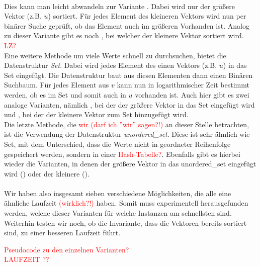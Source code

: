 \\
Dies kann man leicht abwandeln zur Variante \SorSea. Dabei wird nur der größere Vektor (z.B. $u$)
sortiert.
Für jedes Element des kleineren Vektors wird nun per binärer Suche geprüft, ob das Element auch im 
größeren Vorhanden ist. Analog zu dieser Variante gibt es noch \SeaSor, bei welcher 
der kleinere Vektor sortiert wird. \textcolor{red}{LZ?}
\\
Eine weitere Methode um  viele Werte schnell zu durchsuchen, bietet die Datenstruktur \textit{Set}.
Dabei wird jedes Element des einen Vektors (z.B. $u$) in das Set eingefügt. Die Datenstruktur
baut aus diesen Elementen dann einen Binären Suchbaum. Für jedes Element aus $v$ kann nun in logarithmischer
Zeit bestimmt werden, ob es im Set und somit auch in $u$ vorhanden ist. Auch hier gibt es zwei
analoge Varianten, nämlich \SetSea, bei der der größere Vektor in das Set eingefügt wird
und \SeaSet, bei der der kleinere Vektor zum Set hinzugefügt wird.
\\
Die letzte Methode, die \textcolor{red}{wir (darf ich ''wir'' sagen?!)} an dieser Stelle betrachten,
ist die Verwendung der Datenstruktur \textit{unordered\_set}. Diese ist sehr ähnlich wie Set, mit
dem Unterschied, dass die Werte nicht in geordneter Reihenfolge gespeichert werden, sondern
in einer \textcolor{red}{Hash-Tabelle?}. Ebenfalls gibt es hierbei wieder die Varianten, 
in denen der größere Vektor in das unordered\_set eingefügt wird (\USetSea) 
oder der kleinere (\SeaUSet).
\\
\\
Wir haben also insgesamt sieben verschiedene Möglichkeiten, die alle eine ähnliche Laufzeit \textcolor{red}{(wirklich?!)}
haben. Somit muss experimentell herausgefunden werden, welche dieser Varianten für welche Instanzen am
schnellsten sind. Weiterhin testen wir noch, ob die Invariante, dass die Vektoren bereits 
sortiert sind, zu einer besseren Laufzeit führt.


\textcolor{red}{Pseudocode zu den einzelnen Varianten?}\\
\textcolor{red}{LAUFZEIT ??}





